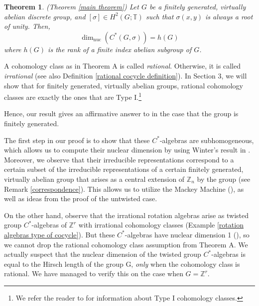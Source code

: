 \documentclass{amsart}
\newtheorem{theorem}{Theorem}[section]
\theoremstyle{definition}
\newcommand{\Z}{\mathbb{Z}}
\newcommand{\TT}{\mathbb{T}}
\DeclareMathOperator{\nuc}{nuc}
\newcommand{\dimnuc}{\dim_{\nuc}}
\begin{document}
\begin{theorem} (Theorem \ref{main theorem})
Let $G$ be a finitely generated, virtually abelian discrete group, and $[\sigma]\in H^2(G;\TT)$ such that $\sigma(x,y)$ is always a root of unity. Then, $$\dimnuc(C^*(G,\sigma))=h(G)$$
where $h(G)$ is the rank of a finite index abelian subgroup of $G$.

\end{theorem}


A cohomology class as in Theorem A is called \emph{rational}. Otherwise, it is called \emph{irrational} (see also Definition \ref{rational cocycle definition}). In Section 3, we will show that for finitely generated, virtually abelian groups, rational cohomology classes are exactly the ones that are Type I.\footnote{We refer the reader to \cite{kleppner_type_I_cocycles} for information about Type I cohomology classes.} \par
Hence, our result gives an affirmative answer to \cite[Question 2.14]{BL24} in the case that the group is finitely generated. \par
The first step in our proof is to show that these $C^*$-algebras are subhomogeneous, which allows us to compute their nuclear dimension by using Winter's result in \cite{Win04}. Moreover, we observe that their irreducible representations correspond to a certain subset of the irreducible representations of a certain finitely generated, virtually abelian group that arises as a central extension of $\Z_n$ by the group (see Remark \ref{correspondence}). This allows us to utilize the Mackey Machine (\cite[Thm. 4.28]{KanTay13}), as well as ideas from the proof of the untwisted case. \par
On the other hand, observe that the irrational rotation algebras arise as twisted group $C^*$-algebras of $\Z^r$ with irrational cohomology classes (Example \ref{rotation algebras type of cocycle}). But these $C^*$-algebras have nuclear dimension 1 (\cite[Example 6.1]{WZ10}), so we cannot drop the rational cohomology class assumption from Theorem A. We actually suspect that the nuclear dimension of the twisted group $C^*$-algebras is equal to the Hirsch length of the group G, \emph{only} when the cohomology class is rational. We have managed to verify this on the case when $G=\Z^r$.
\end{document}
